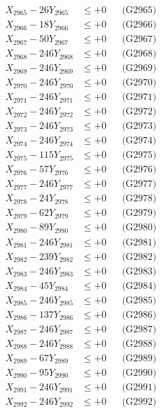 \documentclass[a4paper,10pt]{article}
\begin{document}
{\begin{align}
X_{2965} - 26Y_{2965} &\leq +0 && \text{(G2965)} \\
X_{2966} - 18Y_{2966} &\leq +0 && \text{(G2966)} \\
X_{2967} - 50Y_{2967} &\leq +0 && \text{(G2967)} \\
X_{2968} - 246Y_{2968} &\leq +0 && \text{(G2968)} \\
X_{2969} - 246Y_{2969} &\leq +0 && \text{(G2969)} \\
X_{2970} - 246Y_{2970} &\leq +0 && \text{(G2970)} \\
\allowbreak
X_{2971} - 246Y_{2971} &\leq +0 && \text{(G2971)} \\
X_{2972} - 246Y_{2972} &\leq +0 && \text{(G2972)} \\
X_{2973} - 246Y_{2973} &\leq +0 && \text{(G2973)} \\
X_{2974} - 246Y_{2974} &\leq +0 && \text{(G2974)} \\
X_{2975} - 115Y_{2975} &\leq +0 && \text{(G2975)} \\
X_{2976} - 57Y_{2976} &\leq +0 && \text{(G2976)} \\
X_{2977} - 246Y_{2977} &\leq +0 && \text{(G2977)} \\
X_{2978} - 24Y_{2978} &\leq +0 && \text{(G2978)} \\
X_{2979} - 62Y_{2979} &\leq +0 && \text{(G2979)} \\
X_{2980} - 89Y_{2980} &\leq +0 && \text{(G2980)} \\
\allowbreak
X_{2981} - 246Y_{2981} &\leq +0 && \text{(G2981)} \\
X_{2982} - 239Y_{2982} &\leq +0 && \text{(G2982)} \\
X_{2983} - 246Y_{2983} &\leq +0 && \text{(G2983)} \\
X_{2984} - 45Y_{2984} &\leq +0 && \text{(G2984)} \\
X_{2985} - 246Y_{2985} &\leq +0 && \text{(G2985)} \\
X_{2986} - 137Y_{2986} &\leq +0 && \text{(G2986)} \\
X_{2987} - 246Y_{2987} &\leq +0 && \text{(G2987)} \\
X_{2988} - 246Y_{2988} &\leq +0 && \text{(G2988)} \\
X_{2989} - 67Y_{2989} &\leq +0 && \text{(G2989)} \\
X_{2990} - 95Y_{2990} &\leq +0 && \text{(G2990)} \\
\allowbreak
X_{2991} - 246Y_{2991} &\leq +0 && \text{(G2991)} \\
X_{2992} - 246Y_{2992} &\leq +0 && \text{(G2992)} \\

\end{align}}
\end{document}
